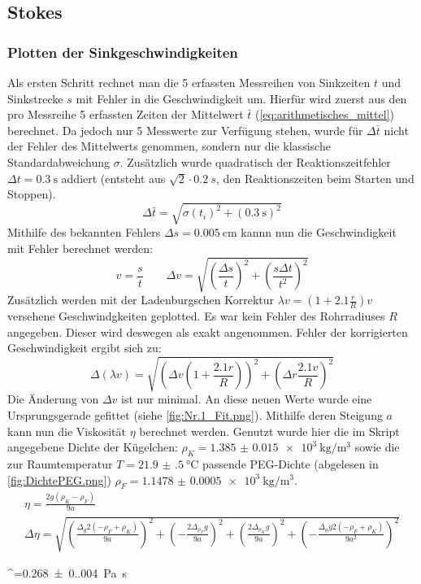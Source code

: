 \subsection{Stokes}
\subsubsection*{Plotten der Sinkgeschwindigkeiten}
Als ersten Schritt rechnet man die 5 erfassten Messreihen von Sinkzeiten \(t\) und Sinkstrecke \(s\) mit Fehler in die Geschwindigkeit um. Hierfür wird zuerst aus den pro Messreihe 5 erfassten Zeiten der Mittelwert \(\bar{t}\) (\cref{eq:arithmetisches_mittel}) berechnet. Da jedoch nur 5 Messwerte zur Verfügung stehen, wurde für \(\Delta \bar{t}\) nicht der Fehler des Mittelwerts genommen, sondern nur die klassische Standardabweichung \(\sigma\). Zusätzlich wurde quadratisch der Reaktionszeitfehler \(\Delta t=\qty{0.3}{\s}\) addiert (entsteht aus \(\sqrt{2}\cdot\qty{0.2}{s}\), den Reaktionszeiten beim Starten und Stoppen). 
\begin{equation}
    \Delta \bar{t}=\sqrt{\sigma(t_i)^2+(\qty{0.3}{\s})^2}
\end{equation}
Mithilfe des bekannten Fehlers \(\Delta s=\qty{0.005}{\cm}\) kannn nun die Geschwindigkeit mit Fehler berechnet werden:
\begin{equation}
    v=\frac{s}{t}\qquad \Delta v=\sqrt{\left(\frac{\Delta s}{t}\right)^2+\left(\frac{s\Delta t}{t^2}\right)^2}
    \label{eq:Geschwindigkeit}
\end{equation}
Zusätzlich werden mit der Ladenburgschen Korrektur \(\lambda v=(1+2.1\frac{r}{R})v\) versehene Geschwindgkeiten geplotted. Es war kein Fehler des Rohrradiuses \(R\) angegeben. Dieser wird deswegen als exakt angenommen. Fehler der korrigierten Geschwindigkeit ergibt sich zu:
\begin{equation}
\Delta (\lambda v)=\sqrt{\left(\Delta{v} \left(1 + \frac{2.1 r}{R}\right)\right)^{2} + \left(\Delta{r}\frac{2.1v}{R}\right)^{2}}
\end{equation}
Die Änderung von \(\Delta v\) ist nur minimal. An diese neuen Werte wurde eine Ursprungsgerade gefittet (siehe \cref{fig:Nr.1_Fit.png}). Mithilfe deren Steigung \(a\) kann nun die Viskosität \(\eta\) berechnet werden. Genutzt wurde hier die im Skript angegebene Dichte der Kügelchen: \(\rho_K=\qty{1.385(15)e3}{\kg\per\m\cubed}\) sowie die zur Raumtemperatur \(T=\qty{21.9(5)}{\degreeCelsius}\) passende PEG-Dichte (abgelesen in \cref{fig:DichtePEG.png}) \(\rho_F=\qty{1.1478(5)e3}{\kg\per\m\cubed}\).
\begin{gather}
    \eta=\frac{2g \left(\rho_{K}-\rho_{F}\right)}{9 a}\\
   \Delta \eta = \sqrt{\left(\frac{\Delta_{g} 2\left(-\rho_{F} +\rho_{K}\right)}{9 a}\right)^{2} + \left(- \frac{2 \Delta_{\rho_F} g}{9 a}\right)^{2} + \left(\frac{2 \Delta_{\rho_K} g}{9 a}\right)^{2} + \left(- \frac{\Delta_{a} g 2\left(-\rho_{F} +\rho_{K}\right)}{9 a^{2}}\right)^{2}}
\end{gather}
\begin{rb}
    \eta^=\qty{0.268(0.004)}{\pascal\s}
\end{rb}

